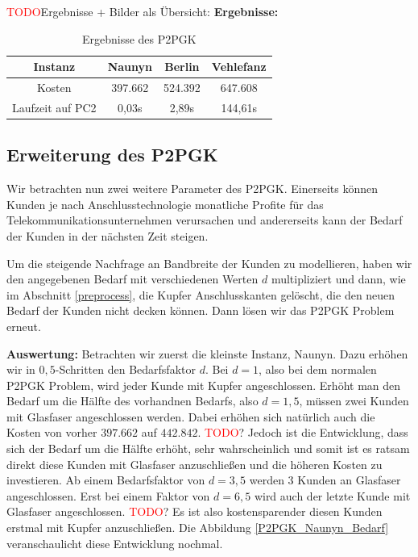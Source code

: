 \documentclass[11pt,a4paper]{article}
\newcommand{\TODO}{\textcolor{red}{TODO}}
\theoremstyle{my_th_style1}
\begin{document}
\TODO Ergebnisse + Bilder als Übersicht:
\textbf{Ergebnisse:} 
\begin{table}[h]
	\centering
	\begin{tabular}{c|c|c|c}
		Instanz & Naunyn & Berlin & Vehlefanz \\	
		\hline
		Kosten & 397.662 & 524.392 & 647.608 \\
		Laufzeit auf PC2 & 0,03s & 2,89s & 144,61s \\
	\end{tabular}
	\label{P2PGK}
	\caption{Ergebnisse des P2PGK} 
\end{table}

\subsection{Erweiterung des P2PGK}
\label{Erweiterung des P2PGK}
Wir betrachten nun zwei weitere Parameter des P2PGK.
Einerseits k\"onnen Kunden je nach Anschlusstechnologie monatliche Profite f\"ur das Telekommunikationsunternehmen verursachen und andererseits kann der Bedarf der Kunden in der n\"achsten Zeit steigen.

Um die steigende Nachfrage an Bandbreite der Kunden zu modellieren, haben wir den angegebenen Bedarf mit verschiedenen Werten $d$ multipliziert und dann, wie im Abschnitt \ref{preprocess}, die Kupfer Anschlusskanten gelöscht, die den neuen Bedarf der Kunden nicht decken können.
Dann lösen wir das P2PGK Problem erneut. 

\textbf{Auswertung:}
Betrachten wir zuerst die kleinste Instanz, Naunyn. Dazu erhöhen wir in $0,5$-Schritten den Bedarfsfaktor $d$. Bei $d=1$, also bei dem normalen P2PGK Problem, wird jeder Kunde mit Kupfer angeschlossen. Erhöht man den Bedarf um die Hälfte des vorhandnen Bedarfs, also $d=1,5$, müssen zwei Kunden mit Glasfaser angeschlossen werden. Dabei erhöhen sich natürlich auch die Kosten von vorher $397.662$ auf $442.842$.
\TODO? Jedoch ist die Entwicklung, dass sich der Bedarf um die Hälfte erhöht, sehr wahrscheinlich und somit ist es ratsam direkt diese Kunden mit Glasfaser anzuschließen und die höheren Kosten zu investieren.
Ab einem Bedarfsfaktor von $d=3,5$ werden 3 Kunden an Glasfaser angeschlossen. Erst bei einem Faktor von $d=6,5$ wird auch der letzte Kunde mit Glasfaser angeschlossen. 
\TODO? Es ist also kostensparender diesen Kunden erstmal mit Kupfer anzuschließen. Die Abbildung \ref{P2PGK_Naunyn_Bedarf} veranschaulicht diese Entwicklung nochmal.
\end{document}
